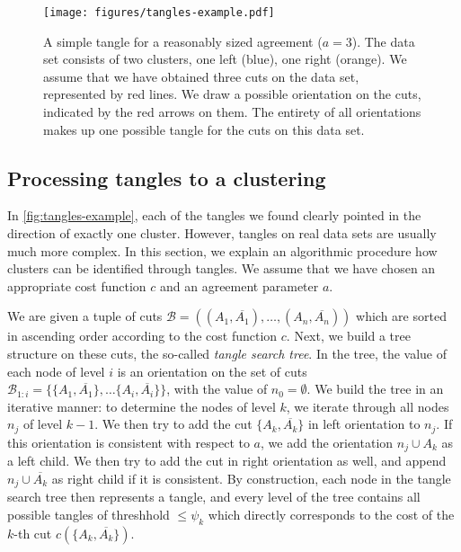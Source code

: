 \begin{figure}[h]
    \centering
    \texttt{[image: figures/tangles-example.pdf]}
    \caption{A simple tangle for a reasonably sized agreement ($a = 3$). 
        The data set consists of two clusters, one left (blue), one right (orange).
        We assume that we have obtained three cuts on the data set, represented 
        by red lines.
        We draw a possible orientation on the cuts, indicated by the red arrows on them. 
        The entirety of all orientations makes up one possible tangle for the cuts 
        on this data set. 
    }
    \label{fig:tangles-example}
\end{figure}

\subsection{Processing tangles to a clustering}
In \autoref{fig:tangles-example}, each of the tangles we found clearly pointed in the direction 
of exactly one cluster. However, tangles on real data sets
are usually much more complex. In this section, we explain an algorithmic procedure how clusters 
can be identified through tangles. We assume that we have chosen an appropriate
cost function $c$ and an agreement parameter $a$. 

We are given a tuple of cuts $\mathcal{B} = \left(  \left( A_1, \overline{A_1} \right) , \ldots, 
\left( A_n, \overline{A_n} \right)\right) $ which are sorted in  
ascending order according to the cost function $c$.  Next, we build a tree structure
on these cuts, the so-called \textit{tangle search tree}. 
In the tree, the value of each node of level $i$ is an orientation on the set of cuts $\mathcal{B}_{1:i} = \{\{A_1, \overline{A_1}\}, \ldots \{A_i, \overline{A_i}\}\}$, with the value of 
$n_0 = \emptyset$.
We build the tree in an iterative manner: to determine the nodes of level $k$, we 
iterate through all nodes $n_j$ of level $k-1$. 
We then try to add the cut $\{A_k, \overline{A_k}\}$ in left orientation to $n_j$. If this
orientation is consistent with respect to $a$, we add the orientation $n_j \cup A_k$ as a left child. 
We then try to add the cut in right orientation as well, and append $n_j \cup \overline{A_k}$ as right child if it is consistent.
By construction, each node in the tangle search tree then represents a tangle, and 
every level of the tree contains all possible tangles of threshhold $\le \psi_k$ which directly corresponds to the cost of the $k$-th cut $c(\{A_k, \overline{A_k}\})$. 

